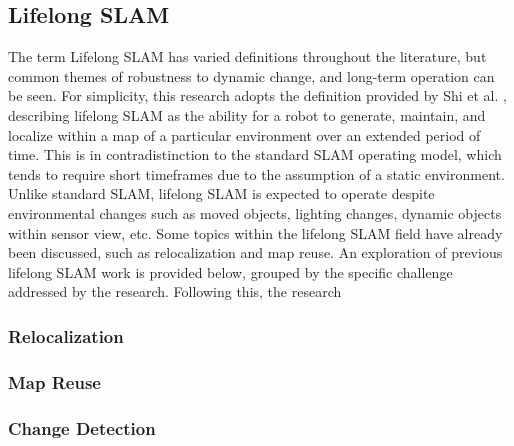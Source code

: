 \subsection{Lifelong SLAM}

The term Lifelong SLAM has varied definitions throughout the literature, but common themes of robustness to dynamic change, and long-term operation can be seen. For simplicity, this research adopts the definition provided by Shi et al. \cite{shiAreWeReady2020}, describing lifelong SLAM as the ability for a robot to generate, maintain, and localize within a map of a particular environment over an extended period of time. This is in contradistinction to the standard SLAM operating model, which tends to require short timeframes due to the assumption of a static environment. Unlike standard SLAM, lifelong SLAM is expected to operate despite environmental changes such as moved objects, lighting changes, dynamic objects within sensor view, etc. Some topics within the lifelong SLAM field have already been discussed, such as relocalization and map reuse. An exploration of previous lifelong SLAM work is provided below, grouped by the specific challenge addressed by the research. Following this, the research 

\subsubsection{Relocalization}
\subsubsection{Map Reuse}
\subsubsection{Change Detection}
